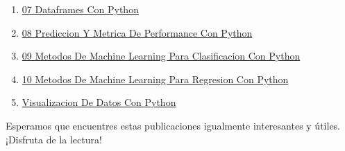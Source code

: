 \documentclass[
  doc,
  floatsintext,
  longtable,
  a4paper,
  nolmodern,
  notxfonts,
  notimes,
  12pt,
  colorlinks=true,linkcolor=blue,citecolor=blue,urlcolor=blue]{apa7}
\begin{document}
\begin{enumerate}
  \href{https://numerus-scriptum.netlify.app/python/2021-08-16-06-funciones-con-python}{06
  Funciones Con Python}
\item
  \href{https://numerus-scriptum.netlify.app/python/2021-08-23-07-dataframes-con-python/index.pdf}{}
  \href{https://numerus-scriptum.netlify.app/python/2021-08-23-07-dataframes-con-python}{07
  Dataframes Con Python}
\item
  \href{https://numerus-scriptum.netlify.app/python/2021-11-29-08-prediccion-y-metrica-de-performance-con-python/index.pdf}{}
  \href{https://numerus-scriptum.netlify.app/python/2021-11-29-08-prediccion-y-metrica-de-performance-con-python}{08
  Prediccion Y Metrica De Performance Con Python}
\item
  \href{https://numerus-scriptum.netlify.app/python/2021-12-06-09-metodos-de-machine-learning-para-clasificacion-con-python/index.pdf}{}
  \href{https://numerus-scriptum.netlify.app/python/2021-12-06-09-metodos-de-machine-learning-para-clasificacion-con-python}{09
  Metodos De Machine Learning Para Clasificacion Con Python}
\item
  \href{https://numerus-scriptum.netlify.app/python/2021-12-13-10-metodos-de-machine-learning-para-regresion-con-python/index.pdf}{}
  \href{https://numerus-scriptum.netlify.app/python/2021-12-13-10-metodos-de-machine-learning-para-regresion-con-python}{10
  Metodos De Machine Learning Para Regresion Con Python}
\item
  \href{https://numerus-scriptum.netlify.app/python/2025-05-10-visualizacion-de-datos-con-python/index.pdf}{}
  \href{https://numerus-scriptum.netlify.app/python/2025-05-10-visualizacion-de-datos-con-python}{Visualizacion
  De Datos Con Python}
\end{enumerate}

Esperamos que encuentres estas publicaciones igualmente interesantes y
útiles. ¡Disfruta de la lectura!
\end{document}

